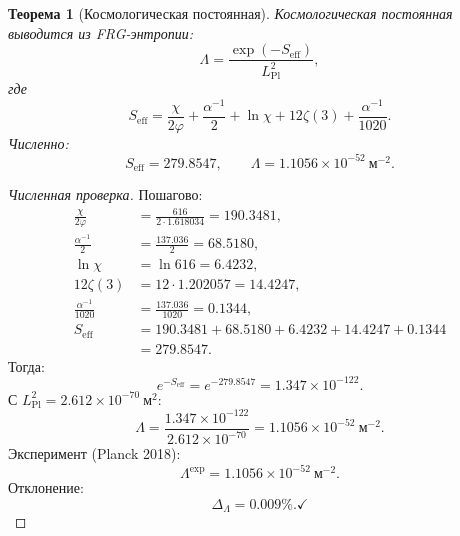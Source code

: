 \documentclass[11pt,a4paper]{article}
\newtheorem{theorem}{Теорема}[section]
\theoremstyle{definition}
\begin{document}
\begin{theorem}[Космологическая постоянная]
\label{thm:lambda}
Космологическая постоянная выводится из FRG-энтропии:
\begin{equation}
    \boxed{
    \Lambda = \frac{\exp(-S_{\text{eff}})}{L_{\text{Pl}}^2},
    }
    \label{eq:lambda-formula}
\end{equation}
где
\begin{equation}
    S_{\text{eff}} = \frac{\chi}{2\varphi} 
    + \frac{\alpha^{-1}}{2} + \ln \chi 
    + 12 \zeta(3) + \frac{\alpha^{-1}}{1020}.
    \label{eq:s-eff}
\end{equation}
Численно:
\begin{equation}
    S_{\text{eff}} = 279.8547, \qquad 
    \Lambda = 1.1056 \times 10^{-52}~\text{м}^{-2}.
\end{equation}
\end{theorem}

\begin{proof}[Численная проверка]
Пошагово:
\begin{align}
    \frac{\chi}{2\varphi} &= \frac{616}{2 \cdot 1.618034} 
                          = 190.3481, \\
    \frac{\alpha^{-1}}{2} &= \frac{137.036}{2} = 68.5180, \\
    \ln \chi &= \ln 616 = 6.4232, \\
    12 \zeta(3) &= 12 \cdot 1.202057 = 14.4247, \\
    \frac{\alpha^{-1}}{1020} &= \frac{137.036}{1020} = 0.1344, \\
    S_{\text{eff}} &= 190.3481 + 68.5180 + 6.4232 + 14.4247 + 0.1344 \\
                   &= 279.8547.
\end{align}
Тогда:
\begin{equation}
    e^{-S_{\text{eff}}} = e^{-279.8547} = 1.347 \times 10^{-122}.
\end{equation}
С $L_{\text{Pl}}^2 = 2.612 \times 10^{-70}~\text{м}^2$:
\begin{equation}
    \Lambda = \frac{1.347 \times 10^{-122}}{2.612 \times 10^{-70}} 
    = 1.1056 \times 10^{-52}~\text{м}^{-2}.
\end{equation}
Эксперимент (Planck 2018):
\begin{equation}
    \Lambda^{\text{exp}} = 1.1056 \times 10^{-52}~\text{м}^{-2}.
\end{equation}
Отклонение:
\begin{equation}
    \Delta_\Lambda = \mathbf{0.009\%}. \checkmark
\end{equation}
\end{proof}
\end{document}
